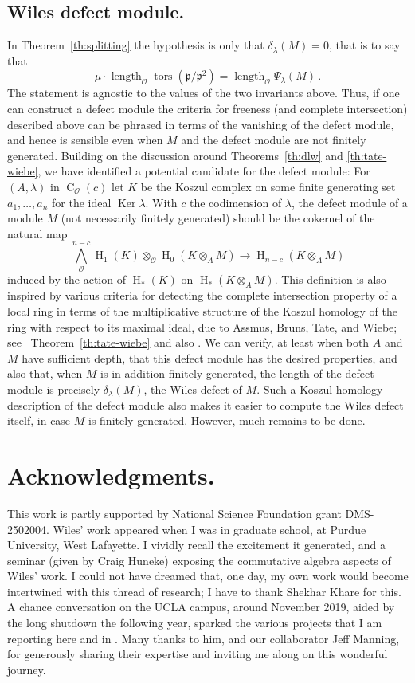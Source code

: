 \documentclass[twoside,leqno]{article}
\newcommand{\cato}{\operatorname{C}}
\newcommand{\fp}{{\mathfrak p}}
\newcommand{\hh}{\operatorname{H}}
\newcommand{\Ker}{\operatorname{Ker}}
\newcommand{\length}{\operatorname{length}}
\newcommand{\mco}{\mathcal O}
\newcommand{\tors}{\operatorname{tors}}
\begin{document}
\subsection*{Wiles defect module.}
In Theorem~\ref{th:splitting} the hypothesis is only that $\delta_\lambda(M)=0$, that is to say that
\begin{equation}
\label{eq:delta=0}
\mu\cdot \length_{\mco} \tors(\fp/\fp^2) = \length_{\mco} \Psi_{\lambda}(M)\,.
\end{equation}
The statement is agnostic to the values of the two invariants above. Thus, if one can construct a defect module the criteria for freeness (and complete intersection) described above can be phrased in terms of the vanishing of the defect module, and hence is sensible even when $M$ and the defect module are not  finitely generated. Building on the discussion around Theorems~\ref{th:dlw} and \ref{th:tate-wiebe},  we have identified a potential candidate for the defect module: For $(A,\lambda)$ in $\cato_{\mco}(c)$ let $K$ be the Koszul complex on some finite generating set $a_1,\dots,a_n$ for the ideal $\Ker \lambda$. With $c$ the codimension of $\lambda$, the defect module of a module $M$ (not necessarily finitely generated) should be the cokernel of the natural map
\[
\bigwedge^{n-c}_{\mco}\hh_1(K)\otimes_{\mco} \hh_0(K\otimes_A M) \longrightarrow \hh_{n-c}(K\otimes_AM)
\]
induced by the action of $\hh_*(K)$ on $\hh_*(K\otimes_AM)$. This definition is also inspired by various criteria for detecting the complete intersection property of a local ring in terms of the multiplicative structure of the Koszul homology of the ring with respect to its maximal ideal, due to Assmus, Bruns, Tate, and Wiebe; see~ Theorem~\ref{th:tate-wiebe} and also \cite[\S2.3]{Bruns/Herzog:1998a}. We can verify, at least when both $A$ and $M$ have sufficient depth, that this defect module has the desired properties, and also that, when $M$ is in addition finitely generated, the length of the defect module is precisely $\delta_\lambda(M)$, the Wiles defect of $M$. Such a Koszul homology description of the defect module also makes it easier to compute the Wiles defect itself, in case $M$ is finitely generated. However, much remains to be done.


\section*{Acknowledgments.}
This work is partly supported by National Science Foundation grant DMS-2502004.  Wiles' work appeared when I was in graduate school, at Purdue University, West Lafayette. I vividly recall the excitement it generated, and a seminar (given by Craig Huneke) exposing the commutative algebra aspects of Wiles' work. I could not have dreamed that, one day, my own work would become intertwined with this thread of research; I have to thank Shekhar Khare for this. A chance conversation on the UCLA campus, around November 2019, aided by the long shutdown the following year, sparked the various projects that I am reporting here and in \cite{Iyengar/Khare/Manning:2025a}. Many thanks to him, and our collaborator Jeff Manning, for generously sharing their expertise and  inviting me along on this wonderful journey. 
\end{document}
